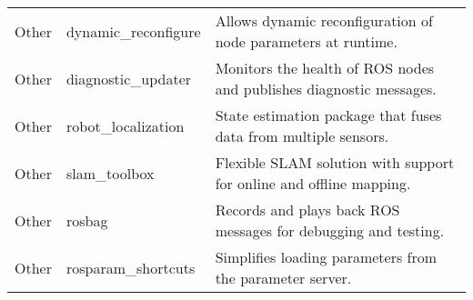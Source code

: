 \documentclass[../../main]{subfiles}
\begin{document}
\begin{longtable}{|>{\centering\arraybackslash}p{4cm}|>{\centering\arraybackslash}p{4cm}|p{6cm}|}
Other & dynamic\_reconfigure & Allows dynamic reconfiguration of node parameters at runtime. \\
Other & diagnostic\_updater & Monitors the health of ROS nodes and publishes diagnostic messages. \\
Other & robot\_localization & State estimation package that fuses data from multiple sensors. \\
Other & slam\_toolbox & Flexible SLAM solution with support for online and offline mapping. \\
Other & rosbag & Records and plays back ROS messages for debugging and testing. \\
Other & rosparam\_shortcuts & Simplifies loading parameters from the parameter server. \\

\end{longtable}
\end{document}
